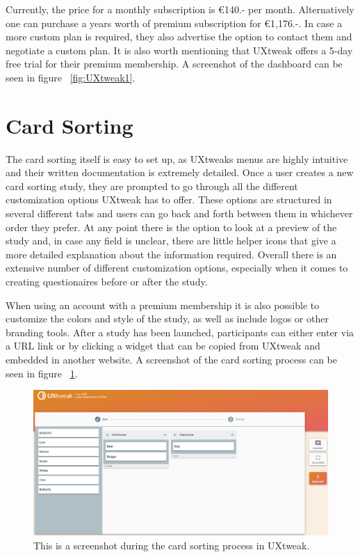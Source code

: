 Currently, the price for a monthly subscription is €140.- per month. 
Alternatively one can purchase a years worth of premium subscription for
€1,176.-. In case a more custom plan is required, they also advertise the 
option to contact them and negotiate a custom plan. It is also worth 
mentioning that UXtweak offers a 5-day free trial for their premium membership.
A screenshot of the dashboard can be seen in figure ~\ref{fig:UXtweak1}.

\section{Card Sorting}
The card sorting itself is  easy to set up, as UXtweaks menus are highly 
intuitive and their written documentation is extremely detailed. Once a user 
creates a new card sorting study, they are prompted to go through all the 
different customization options UXtweak has to offer. These options are 
structured in several different tabs and users can go back and forth between 
them in whichever order they prefer. At any point there is the option to look at
a preview of the study and, in case any field is unclear, there are little helper
icons that give a more detailed explanation about the information required. 
Overall there is an extensive number of different customization options,
especially when it comes to creating questionaires before or after the study. 

When using an account with a premium membership it is also possible to customize
the colors and style of the study, as well as include logos or other branding 
tools. After a study has been launched, participants can either enter via a URL 
link or by clicking a widget that can be copied from UXtweak and embedded in 
another website. A screenshot of the card sorting process can be seen in figure
~\ref{fig:UXtweak2}.

\begin{figure}[tp] 
\centering
\includegraphics[keepaspectratio,width=\linewidth,height=\halfh]{images/uxtweak-sorting.png}
\caption[UXtweak Card Sorting] { This is a screenshot during the card
sorting process in UXtweak.
 }
\label{fig:UXtweak2}
\end{figure}

